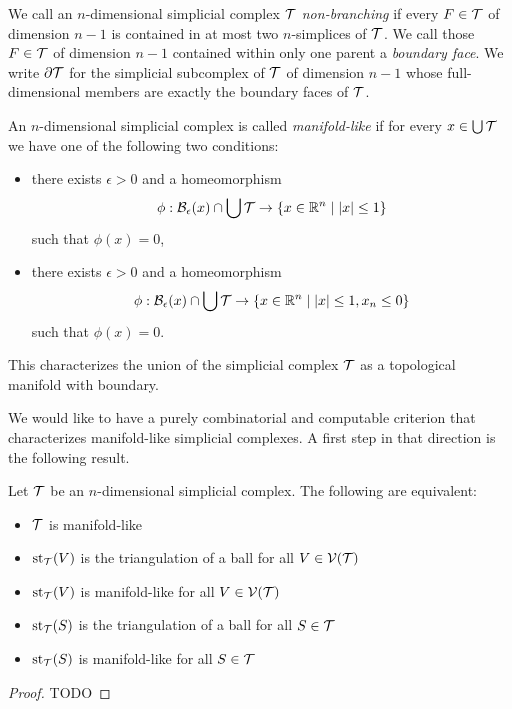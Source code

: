 \documentclass[a4paper]{amsart}
\begin{document}
We call an $n$-dimensional simplicial complex ${\mathcal T}$ \emph{non-branching} if every $F \in {\mathcal T}$ of dimension $n-1$ is contained in at most two $n$-simplices of ${\mathcal T}$. We call those $F \in {\mathcal T}$ of dimension $n-1$ contained within only one parent a \emph{boundary face}.
We write $\partial{\mathcal T}$ for the simplicial subcomplex of ${\mathcal T}$ of dimension $n-1$ 
whose full-dimensional members are exactly the boundary faces of ${\mathcal T}$.

An $n$-dimensional simplicial complex is called \emph{manifold-like} if for every $x \in \bigcup {\mathcal T}$
we have one of the following two conditions:
\begin{itemize}
 \item 
 there exists $\epsilon > 0$ 
 and a homeomorphism 
 \begin{align*}
    \phi : \Ball_\epsilon(x) \cap \bigcup\calT  
    \rightarrow 
    \left\{ x \in \bbR^{n} \suchthat |x| \leq 1 \right\}
 \end{align*}
 such that $\phi(x) = 0$,
 \item 
 there exists $\epsilon > 0$ and a homeomorphism 
 \begin{align*}
    \phi : \Ball_\epsilon(x) \cap \bigcup\calT 
    \rightarrow 
    \left\{ x \in \bbR^{n} \suchthat |x| \leq 1, x_n \leq 0 \right\}
 \end{align*}
 such that $\phi(x) = 0$.
\end{itemize}
This characterizes the union of the simplicial complex ${\mathcal T}$ as a topological manifold with boundary. 

We would like to have a purely combinatorial and computable criterion that characterizes manifold-like simplicial complexes. A first step in that direction is the following result.

\begin{lemma}\label{lemma:characterizationofmanifoldcomplexes}
    Let ${\mathcal T}$ be an $n$-dimensional simplicial complex. The following are equivalent:
    \begin{itemize}
     \item ${\mathcal T}$ is manifold-like
     \item $\operatorname{st}_{{\mathcal T}}(V)$ is the triangulation of a ball for all $V \in {\mathcal V}({\mathcal T})$
     \item $\operatorname{st}_{{\mathcal T}}(V)$ is manifold-like for all $V \in {\mathcal V}({\mathcal T})$
     \item $\operatorname{st}_{{\mathcal T}}(S)$ is the triangulation of a ball for all $S \in {\mathcal T}$
     \item $\operatorname{st}_{{\mathcal T}}(S)$ is manifold-like for all $S \in {\mathcal T}$
    \end{itemize}
\end{lemma}
\begin{proof}
    \color{red} TODO
\end{proof}
\end{document}
